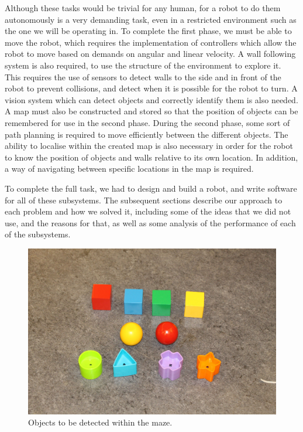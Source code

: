 \documentclass[10pt,a4paper]{article}
\begin{document}
Although these tasks would be trivial for any human, for a robot to do them
autonomously is a very demanding task, even in a restricted environment such as
the one we will be operating in. To complete the first phase, we must be able to
move the robot, which requires the implementation of controllers which allow the
robot to move based on demands on angular and linear velocity. A wall following
system is also required, to use the structure of the environment to explore it.
This requires the use of sensors to detect walls to the side and in front of the
robot to prevent collisions, and detect when it is possible for the robot to
turn. A vision system which can detect objects and correctly identify them is
also needed. A map must also be constructed and stored so that the position of
objects can be remembered for use in the second phase. During the second phase,
some sort of path planning is required to move efficiently between the different
objects. The ability to localise within the created map is also necessary in
order for the robot to know the position of objects and walls relative to its
own location. In addition, a way of navigating between specific locations in the
map is required.

To complete the full task, we had to design and build a robot, and write
software for all of these subsystems. The subsequent sections describe our
approach to each problem and how we solved it, including some of the ideas that
we did not use, and the reasons for that, as well as some analysis of the
performance of each of the subsystems.

\begin{figure}
  \centering
  \includegraphics[width=\linewidth]{images/objects.jpg}
  \caption{Objects to be detected within the maze.}
  \label{fig:shapes}
\end{figure}
\end{document}
